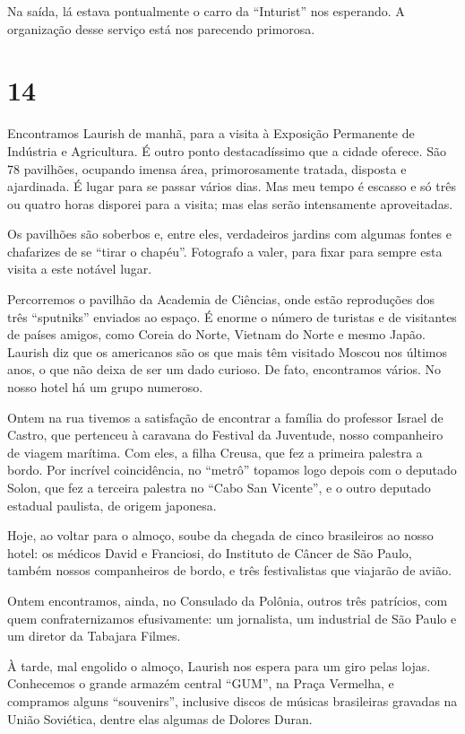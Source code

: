 Na saída, lá estava pontualmente o carro da ``Inturist'' nos esperando. A organização desse serviço está nos parecendo primorosa.

\section*{14 \adfflatleafright {}}
Encontramos Laurish de manhã, para a visita à Exposição Permanente de Indústria e Agricultura. É outro ponto destacadíssimo que a cidade oferece. São 78 pavilhões, ocupando imensa área, primorosamente tratada, disposta e ajardinada. É lugar para se passar vários dias. Mas meu tempo é escasso e só três ou quatro horas disporei para a visita; mas elas serão intensamente aproveitadas.

Os pavilhões são soberbos e, entre eles, verdadeiros jardins com algumas fontes e chafarizes de se ``tirar o chapéu''. Fotografo a valer, para fixar para sempre esta visita a este notável lugar.

Percorremos o pavilhão da Academia de Ciências, onde estão reproduções dos três ``sputniks'' enviados ao espaço. É enorme o número de turistas e de visitantes de países amigos, como Coreia do Norte, Vietnam do Norte e mesmo Japão. Laurish diz que os americanos são os que mais têm visitado Moscou nos últimos anos, o que não deixa de ser um dado curioso. De fato, encontramos vários. No nosso hotel há um grupo numeroso.

Ontem na rua tivemos a satisfação de encontrar a família do professor Israel de Castro, que pertenceu à caravana do Festival da Juventude, nosso companheiro de viagem marítima. Com eles, a filha Creusa, que fez a primeira palestra a bordo. Por incrível coincidência, no ``metrô'' topamos logo depois com o deputado Solon, que fez a terceira palestra no ``Cabo San Vicente'', e o outro deputado estadual paulista, de origem japonesa.

Hoje, ao voltar para o almoço, soube da chegada de cinco brasileiros ao nosso hotel: os médicos David e Franciosi, do Instituto de Câncer de São Paulo, também nossos companheiros de bordo, e três festivalistas que viajarão de avião.

Ontem encontramos, ainda, no Consulado da Polônia, outros três patrícios, com quem confraternizamos efusivamente: um jornalista, um industrial de São Paulo e um diretor da Tabajara Filmes.

À tarde, mal engolido o almoço, Laurish nos espera para um giro pelas lojas. Conhecemos o grande armazém central ``GUM'', na Praça Vermelha, e compramos alguns ``souvenirs'', inclusive discos de músicas brasileiras gravadas na União Soviética, dentre elas algumas de Dolores Duran.

